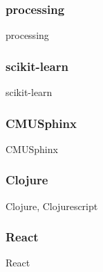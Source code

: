 \subsubsection*{processing}
processing

\subsubsection*{scikit-learn}
scikit-learn

\subsubsection*{CMUSphinx}
CMUSphinx

\subsubsection*{Clojure}
Clojure, Clojurescript

\subsubsection*{React}
React